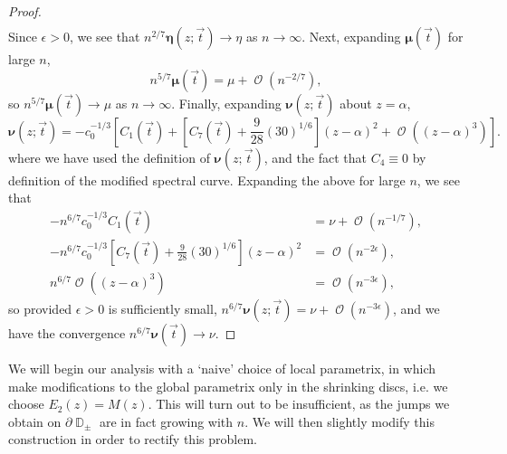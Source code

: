 \documentclass[usenames,dvipsnames]{article}
\theoremstyle{definition}
\DeclareMathOperator{\DD}{\mathbb{D}}
\DeclareMathOperator{\OO}{\mathcal{O}}
\numberwithin{equation}{section}
\numberwithin{figure}{section}
\begin{document}
\begin{proof}
\begin{align*}
            \end{align*}
        Since $\epsilon>0$, we see that $n^{2/7}\boldsymbol{\eta}(z;\vec{t}) \to \eta$ as $n\to \infty$. 
        Next, expanding $\boldsymbol{\mu}(\vec{t})$ for large $n$, 
            \begin{equation*}
                n^{5/7}\boldsymbol{\mu}(\vec{t}) = \mu + \OO(n^{-2/7}),
            \end{equation*}
        so $n^{5/7}\boldsymbol{\mu}(\vec{t}) \to \mu$ as $n\to \infty$. Finally, expanding $\boldsymbol{\nu}(z;\vec{t})$ about $z=\alpha$,
            \begin{equation}
                \boldsymbol{\nu}(z;\vec{t}) =-c_0^{-1/3}\left[ C_1(\vec{t}) + \left[C_7(\vec{t}) + \frac{9}{28}(30)^{1/6}\right](z-\alpha)^2 + \OO((z-\alpha)^3)\right].
            \end{equation}
        where we have used the definition of $\boldsymbol{\nu}(z;\vec{t})$,  and the fact that $C_4\equiv 0$ by definition of the modified spectral curve. 
        Expanding the above for large $n$, we see that
            \begin{align*}
                -n^{6/7}c_0^{-1/3}C_1(\vec{t}) &= \nu + \OO(n^{-1/7}),\\
                -n^{6/7}c_0^{-1/3}\left[C_7(\vec{t}) + \frac{9}{28}(30)^{1/6}\right](z-\alpha)^2 &= \OO(n^{-2\epsilon}),\\
                n^{6/7}\OO((z-\alpha)^3) &= \OO(n^{-3\epsilon}),
            \end{align*}
        so provided $\epsilon>0$ is sufficiently small, $n^{6/7}\boldsymbol{\nu}(z;\vec{t}) = \nu + \OO(n^{-3\epsilon})$, and we have the convergence
        $n^{6/7}\boldsymbol{\nu}(\vec{t}) \to \nu$.   
    \end{proof}

We will begin our analysis with a `naive' choice of local parametrix, in which make modifications to the global parametrix only in the shrinking discs, i.e. we choose $E_2(z) = M(z)$. This will turn out to be insufficient, as the jumps we obtain on $\partial \DD_{\pm}$ are in fact growing with $n$. We will then slightly modify this construction in order to rectify this problem.
\end{document}

